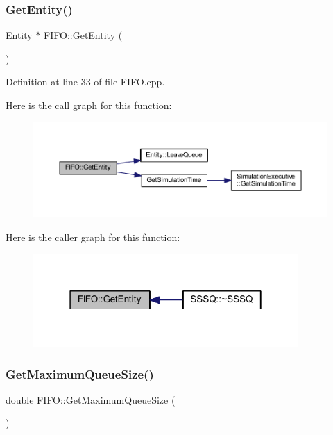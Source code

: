 \subsubsection{\texorpdfstring{Get\+Entity()}{GetEntity()}}
{\footnotesize\ttfamily \hyperlink{class_entity}{Entity} $\ast$ F\+I\+F\+O\+::\+Get\+Entity (\begin{DoxyParamCaption}{ }\end{DoxyParamCaption})}



Definition at line 33 of file F\+I\+F\+O.\+cpp.

Here is the call graph for this function\+:
\nopagebreak
\begin{figure}[H]
\begin{center}
\leavevmode
\includegraphics[width=350pt]{class_f_i_f_o_a428f7532d582435ee5710641f0f87bfd_cgraph}
\end{center}
\end{figure}
Here is the caller graph for this function\+:
\nopagebreak
\begin{figure}[H]
\begin{center}
\leavevmode
\includegraphics[width=286pt]{class_f_i_f_o_a428f7532d582435ee5710641f0f87bfd_icgraph}
\end{center}
\end{figure}
\mbox{\label{class_f_i_f_o_a77a83086bafa4145487dd2918ed36aa4}} 
\subsubsection{\texorpdfstring{Get\+Maximum\+Queue\+Size()}{GetMaximumQueueSize()}}
{\footnotesize\ttfamily double F\+I\+F\+O\+::\+Get\+Maximum\+Queue\+Size (\begin{DoxyParamCaption}{ }\end{DoxyParamCaption})}




